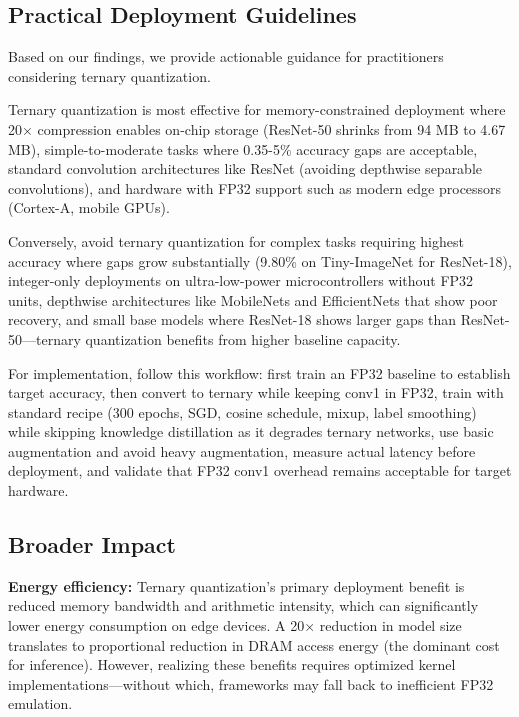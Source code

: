 \subsection{Practical Deployment Guidelines}

Based on our findings, we provide actionable guidance for practitioners considering ternary quantization.

Ternary quantization is most effective for memory-constrained deployment where 20× compression enables on-chip storage (ResNet-50 shrinks from 94 MB to 4.67 MB), simple-to-moderate tasks where 0.35-5\% accuracy gaps are acceptable, standard convolution architectures like ResNet (avoiding depthwise separable convolutions), and hardware with FP32 support such as modern edge processors (Cortex-A, mobile GPUs).

Conversely, avoid ternary quantization for complex tasks requiring highest accuracy where gaps grow substantially (9.80\% on Tiny-ImageNet for ResNet-18), integer-only deployments on ultra-low-power microcontrollers without FP32 units, depthwise architectures like MobileNets and EfficientNets that show poor recovery, and small base models where ResNet-18 shows larger gaps than ResNet-50—ternary quantization benefits from higher baseline capacity.

For implementation, follow this workflow: first train an FP32 baseline to establish target accuracy, then convert to ternary while keeping conv1 in FP32, train with standard recipe (300 epochs, SGD, cosine schedule, mixup, label smoothing) while skipping knowledge distillation as it degrades ternary networks, use basic augmentation and avoid heavy augmentation, measure actual latency before deployment, and validate that FP32 conv1 overhead remains acceptable for target hardware.

\subsection{Broader Impact}

\textbf{Energy efficiency:} Ternary quantization's primary deployment benefit is reduced memory bandwidth and arithmetic intensity, which can significantly lower energy consumption on edge devices. A 20× reduction in model size translates to proportional reduction in DRAM access energy (the dominant cost for inference). However, realizing these benefits requires optimized kernel implementations—without which, frameworks may fall back to inefficient FP32 emulation.

